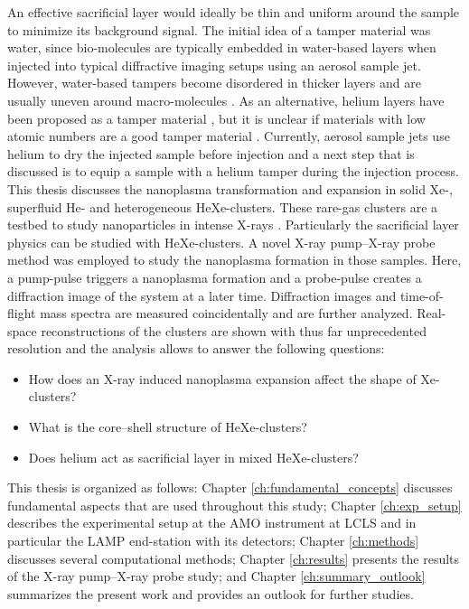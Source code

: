 %
An effective sacrificial layer would ideally be thin and uniform around the sample to minimize its background signal. The initial idea of a tamper material was water, since bio-molecules are typically embedded in water-based layers when injected into typical diffractive imaging setups using an aerosol sample jet. However, water-based tampers become disordered in thicker layers and are usually uneven around macro-molecules \cite{Aquila-2015-StrucDyn}. As an alternative, helium layers have been proposed as a tamper material \cite{Mikaberidze-2008-PRA}, but it is unclear if materials with low atomic numbers are a good tamper material \cite{Hau-Riege-2007-PRL}. Currently, aerosol sample jets use helium to dry the injected sample before injection and a next step that is discussed \cite{Bielecki-2016-PC} is to equip a sample with a helium tamper during the injection process.\\[1\baselineskip]
%
This thesis discusses the nanoplasma transformation and expansion in solid Xe-, superfluid He- and heterogeneous HeXe-clusters. These rare-gas clusters are a testbed to study nanoparticles in intense X-rays \cite{Fennel-2010-RMP}. Particularly the sacrificial layer physics can be studied with HeXe-clusters. A novel X-ray pump--X-ray probe method \cite{Lutman-2013-PRL} was employed to study the nanoplasma formation in those samples. Here, a pump-pulse triggers a nanoplasma formation and a probe-pulse creates a diffraction image of the system at a later time. Diffraction images and time-of-flight mass spectra are measured coincidentally and are further analyzed. Real-space reconstructions of the clusters are shown with thus far unprecedented resolution and the analysis allows to answer the following questions:
\begin{itemize}
	\item How does an X-ray induced nanoplasma expansion affect the shape of Xe-clusters?
	\item What is the core--shell structure of HeXe-clusters?
	\item Does helium act as sacrificial layer in mixed HeXe-clusters?
\end{itemize}
%
This thesis is organized as follows: Chapter \ref{ch:fundamental_concepts} discusses fundamental aspects that are used throughout this study; Chapter \ref{ch:exp_setup} describes the experimental setup at the AMO instrument at LCLS and in particular the LAMP end-station with its detectors; Chapter \ref{ch:methods} discusses several computational methods; Chapter \ref{ch:results} presents the results of the X-ray pump--X-ray probe study; and Chapter \ref{ch:summary_outlook} summarizes the present work and provides an outlook for further studies.
%
%
%